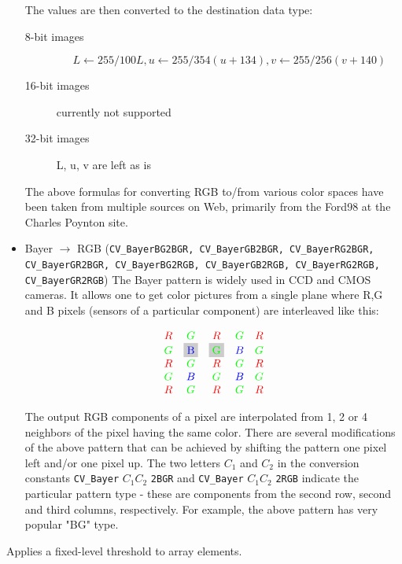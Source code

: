 \begin{itemize}
The values are then converted to the destination data type:
\begin{description}
\item[8-bit images]
\[L \leftarrow 255/100 L, u \leftarrow 255/354 (u + 134), v \leftarrow 255/256 (v + 140) \]
\item[16-bit images] currently not supported
\item[32-bit images] L, u, v are left as is
\end{description}

The above formulas for converting RGB to/from various color spaces have been taken from multiple sources on Web, primarily from
the Ford98
 at the Charles Poynton site.

 \item Bayer $\rightarrow$ RGB (\texttt{CV\_BayerBG2BGR, CV\_BayerGB2BGR, CV\_BayerRG2BGR, CV\_BayerGR2BGR, CV\_BayerBG2RGB, CV\_BayerGB2RGB, CV\_BayerRG2RGB, CV\_BayerGR2RGB}) The Bayer pattern is widely used in CCD and CMOS cameras. It allows one to get color pictures from a single plane where R,G and B pixels (sensors of a particular component) are interleaved like this:

\newcommand{\R}{\color{red}R}
\newcommand{\G}{\color{green}G}
\newcommand{\B}{\color{blue}B}


\[
\definecolor{BackGray}{rgb}{0.8,0.8,0.8}
\begin{array}{ c c c c c }
\R&\G&\R&\G&\R\\
\G&\colorbox{BackGray}{\B}&\colorbox{BackGray}{\G}&\B&\G\\
\R&\G&\R&\G&\R\\
\G&\B&\G&\B&\G\\
\R&\G&\R&\G&\R
\end{array}
\]

The output RGB components of a pixel are interpolated from 1, 2 or
4 neighbors of the pixel having the same color. There are several
modifications of the above pattern that can be achieved by shifting
the pattern one pixel left and/or one pixel up. The two letters
$C_1$ and $C_2$
in the conversion constants
\texttt{CV\_Bayer} $ C_1 C_2 $ \texttt{2BGR}
and
\texttt{CV\_Bayer} $ C_1 C_2 $ \texttt{2RGB}
indicate the particular pattern
type - these are components from the second row, second and third
columns, respectively. For example, the above pattern has very
popular "BG" type.
\end{itemize}

\label{Threshold}

Applies a fixed-level threshold to array elements.

